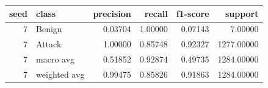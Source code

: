 \begin{tabular}{rlrrrr}
\toprule
seed & class & precision & recall & f1-score & support \\
\midrule
7 & Benign & 0.03704 & 1.00000 & 0.07143 & 7.00000 \\
7 & Attack & 1.00000 & 0.85748 & 0.92327 & 1277.00000 \\
7 & macro avg & 0.51852 & 0.92874 & 0.49735 & 1284.00000 \\
7 & weighted avg & 0.99475 & 0.85826 & 0.91863 & 1284.00000 \\
\bottomrule
\end{tabular}
